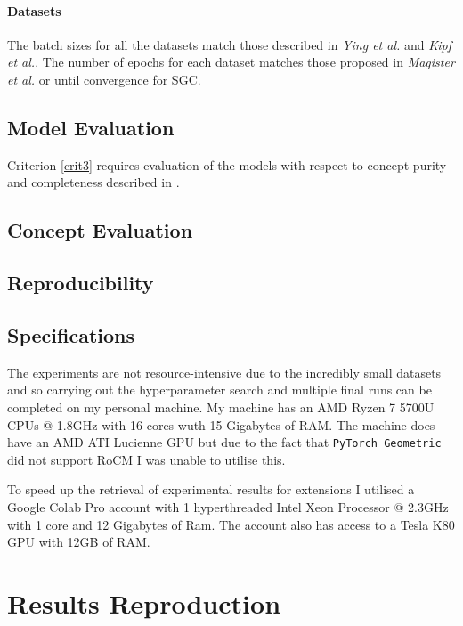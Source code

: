 
\paragraph{Datasets}
The batch sizes for all the datasets match those described in \textit{Ying et al.}\cite{ying2019gnnexplainer} and \textit{Kipf et al.}\cite{kipf2016semi}.
The number of epochs for each dataset matches those proposed in \textit{Magister et al.}\cite{magister2021gcexplainer} or until convergence for SGC.

\subsection{Model Evaluation}

Criterion \ref{crit3} requires evaluation of the models with respect to concept purity and completeness described in .

\subsection{Concept Evaluation}

\subsection{Reproducibility}

\subsection{Specifications}
The experiments are not resource-intensive due to the incredibly small datasets and so carrying out the hyperparameter search and multiple final runs can be completed on my personal machine.
My machine has an AMD Ryzen 7 5700U CPUs @ 1.8GHz with 16 cores wuth 15 Gigabytes of RAM.
The machine does have an AMD ATI Lucienne GPU but due to the fact that \texttt{PyTorch Geometric} did not support RoCM I was unable to utilise this.

To speed up the retrieval of experimental results for extensions I utilised a Google Colab Pro account with 1 hyperthreaded Intel Xeon Processor @ 2.3GHz with 1 core and 12 Gigabytes of Ram.
The account also has access to a Tesla K80 GPU with 12GB of RAM.


\section{Results Reproduction}
\label{sec:reproduction}


